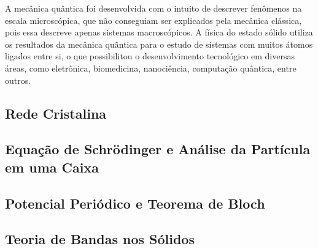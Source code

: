 \par A mecânica quântica foi desenvolvida com o intuito de descrever fenômenos na escala microscópica, que não conseguiam ser explicados pela mecânica clássica, pois essa descreve apenas sistemas macroscópicos. A física do estado sólido utiliza os resultados da mecânica quântica para o estudo de sistemas com muitos átomos ligados entre si, o que possibilitou o desenvolvimento tecnológico em diversas áreas, como eletrônica, biomedicina, nanociência, computação quântica, entre outros.\cite{qm_fis1}


  \subsection{Rede Cristalina}

    

  \subsection{Equação de Schrödinger e Análise da Partícula em uma Caixa}

    

  \subsection{Potencial Periódico e Teorema de Bloch}

    

  \subsection{Teoria de Bandas nos Sólidos}

    